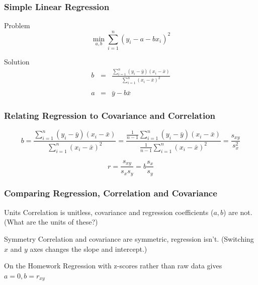 \documentclass{beamer}
\begin{document}
\begin{frame}
\frametitle{Simple Linear Regression}
	\begin{block}{Problem}
	$$\min_{a,b}  \sum_{i=1}^n (y_i - a - b x_i)^2$$
\end{block}
\begin{block}{Solution}
	\begin{eqnarray*}
		b &=& \frac{\sum_{i=1}^n \left(y_i - \bar{y}\right)\left(x_i - \bar{x} \right)}{\sum_{i=1}^n \left(x_i - \bar{x}\right)^2}\\ \\
		a &=& \bar{y} - b\bar{x}
	\end{eqnarray*}
\end{block}
\end{frame}

\begin{frame}
	\frametitle{Relating Regression to Covariance and Correlation}
		$$b = \frac{\sum_{i=1}^n \left(y_i - \bar{y}\right)\left(x_i - \bar{x} \right)}{\sum_{i=1}^n \left(x_i - \bar{x}\right)^2} = \frac{\frac{1}{n-1}\sum_{i=1}^n \left(y_i - \bar{y}\right)\left(x_i - \bar{x} \right)}{\frac{1}{n-1}\sum_{i=1}^n \left(x_i - \bar{x}\right)^2} = \frac{s_{xy}}{s_x^2}$$
		
		$$r = \frac{s_{xy}}{s_x s_y} = b \frac{s_x}{s_y}$$
		
\end{frame}
\begin{frame}
\frametitle{Comparing Regression, Correlation and Covariance}

\begin{block}{Units}
Correlation is unitless, covariance and regression coefficients ($a, b$) are not. (What are the units of these?)
\end{block}


\begin{block}{Symmetry}
Correlation and covariance are symmetric, regression isn't. (Switching $x$ and $y$ axes changes the slope and intercept.)
\end{block}

\begin{block}{On the Homework}
Regression with z-scores rather than raw data gives $a=0, b = r_{xy}$
\end{block}

\end{frame}
\end{document}
